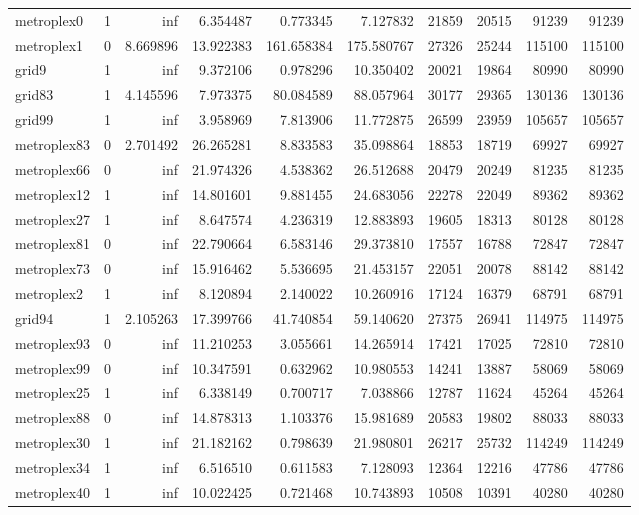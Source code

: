 \begin{longtable}{|l|r|r|r|r|r|r|r|r|r|}
metroplex0 & 1 & inf & 6.354487 & 0.773345 & 7.127832 & 21859 & 20515 & 91239 & 91239 \\
metroplex1 & 0 & 8.669896 & 13.922383 & 161.658384 & 175.580767 & 27326 & 25244 & 115100 & 115100 \\
grid9 & 1 & inf & 9.372106 & 0.978296 & 10.350402 & 20021 & 19864 & 80990 & 80990 \\
grid83 & 1 & 4.145596 & 7.973375 & 80.084589 & 88.057964 & 30177 & 29365 & 130136 & 130136 \\
grid99 & 1 & inf & 3.958969 & 7.813906 & 11.772875 & 26599 & 23959 & 105657 & 105657 \\
metroplex83 & 0 & 2.701492 & 26.265281 & 8.833583 & 35.098864 & 18853 & 18719 & 69927 & 69927 \\
metroplex66 & 0 & inf & 21.974326 & 4.538362 & 26.512688 & 20479 & 20249 & 81235 & 81235 \\
metroplex12 & 1 & inf & 14.801601 & 9.881455 & 24.683056 & 22278 & 22049 & 89362 & 89362 \\
metroplex27 & 1 & inf & 8.647574 & 4.236319 & 12.883893 & 19605 & 18313 & 80128 & 80128 \\
metroplex81 & 0 & inf & 22.790664 & 6.583146 & 29.373810 & 17557 & 16788 & 72847 & 72847 \\
metroplex73 & 0 & inf & 15.916462 & 5.536695 & 21.453157 & 22051 & 20078 & 88142 & 88142 \\
metroplex2 & 1 & inf & 8.120894 & 2.140022 & 10.260916 & 17124 & 16379 & 68791 & 68791 \\
grid94 & 1 & 2.105263 & 17.399766 & 41.740854 & 59.140620 & 27375 & 26941 & 114975 & 114975 \\
metroplex93 & 0 & inf & 11.210253 & 3.055661 & 14.265914 & 17421 & 17025 & 72810 & 72810 \\
metroplex99 & 0 & inf & 10.347591 & 0.632962 & 10.980553 & 14241 & 13887 & 58069 & 58069 \\
metroplex25 & 1 & inf & 6.338149 & 0.700717 & 7.038866 & 12787 & 11624 & 45264 & 45264 \\
metroplex88 & 0 & inf & 14.878313 & 1.103376 & 15.981689 & 20583 & 19802 & 88033 & 88033 \\
metroplex30 & 1 & inf & 21.182162 & 0.798639 & 21.980801 & 26217 & 25732 & 114249 & 114249 \\
metroplex34 & 1 & inf & 6.516510 & 0.611583 & 7.128093 & 12364 & 12216 & 47786 & 47786 \\
metroplex40 & 1 & inf & 10.022425 & 0.721468 & 10.743893 & 10508 & 10391 & 40280 & 40280 \\

\end{longtable}

